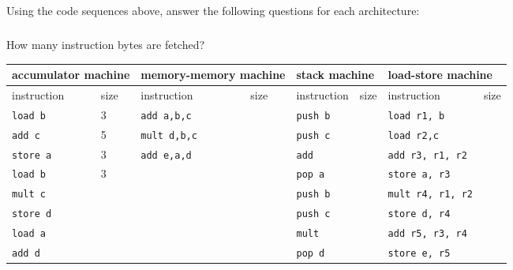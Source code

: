 \documentclass{article}
\begin{document}
\subsection{}
Using the code sequences above, answer the following questions for each architecture:
\subsubsection{}
How many instruction bytes are fetched?\\
\begin{tabular}{l|ll|ll|ll|l|}
\hline
\multicolumn{2}{|l|}{accumulator machine} & \multicolumn{2}{|l|}{memory-memory machine} & \multicolumn{2}{|l|}{stack machine} & \multicolumn{2}{|l|}{load-store machine} \\ \hline
\multicolumn{1}{|l|}{instruction} & size & \multicolumn{1}{|l|}{instruction} & size & \multicolumn{1}{|l|}{instruction} & size & \multicolumn{1}{|l|}{instruction} & size \\ \hline
\multicolumn{1}{|l|}{\texttt{load b}} & 3 & \multicolumn{1}{|l|}{\texttt{add a,b,c}} & & \multicolumn{1}{|l|}{\texttt{push b}} & &\multicolumn{1}{|l|}{\texttt{load r1, b}} & \\ 
\multicolumn{1}{|l|}{\texttt{add c}} & 5 &\multicolumn{1}{|l|}{\texttt{mult d,b,c}} & & \multicolumn{1}{|l|}{\texttt{push c}} & & \multicolumn{1}{|l|}{\texttt{load r2,c}} & \\
\multicolumn{1}{|l|}{\texttt{store a}} & 3 & \multicolumn{1}{|l|}{\texttt{add e,a,d}} & & \multicolumn{1}{|l|}{\texttt{add}} & & \multicolumn{1}{|l|}{\texttt{add r3, r1, r2}} & \\
\multicolumn{1}{|l|}{\texttt{load b}} & 3 & \multicolumn{1}{|l|}{} & & \multicolumn{1}{|l|}{\texttt{pop a}} & & \multicolumn{1}{|l|}{\texttt{store a, r3}} & \\
\multicolumn{1}{|l|}{\texttt{mult c}} & & \multicolumn{1}{|l|}{} & & \multicolumn{1}{|l|}{\texttt{push b}} & & \multicolumn{1}{|l|}{\texttt{mult r4, r1, r2}} & \\
\multicolumn{1}{|l|}{\texttt{store d}} & & \multicolumn{1}{|l|}{} & &\multicolumn{1}{|l|}{\texttt{push c}} & & \multicolumn{1}{|l|}{\texttt{store d, r4}} & \\ 
\multicolumn{1}{|l|}{\texttt{load a}} & & \multicolumn{1}{|l|}{} & & \multicolumn{1}{|l|}{\texttt{mult}} & & \multicolumn{1}{|l|}{\texttt{add r5, r3, r4}} & \\
\multicolumn{1}{|l|}{\texttt{add d}} & & \multicolumn{1}{|l|}{} & & \multicolumn{1}{|l|}{\texttt{pop d}} & & \multicolumn{1}{|l|}{\texttt{store e, r5}} & \\

\end{tabular}
\end{document}

